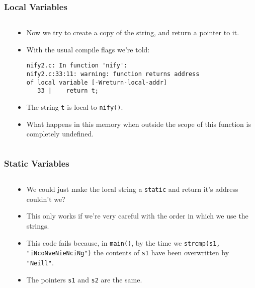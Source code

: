 \begin{frame}[fragile]
\frametitle{Local Variables}
\begin{columns}[T]

\begin{column}{0.35\textwidth}

\end{column}

\pause
\begin{column}{0.55\textwidth}
\begin{itemize}[<+->]
\item Now we try to create a copy of the string, and return a pointer to it.
\item With the usual compile flags we're told:
\begin{verbatim}
nify2.c: In function 'nify':
nify2.c:33:11: warning: function returns address
of local variable [-Wreturn-local-addr]
   33 |    return t;
\end{verbatim}
\item The string \verb^t^ is local to \verb^nify()^.
\item What happens in this memory when outside the scope of this function is completely undefined.
\end{itemize}
\end{column}

\end{columns}
\end{frame}


\begin{frame}[fragile]
\frametitle{Static Variables}
\begin{columns}[T]

\begin{column}{0.35\textwidth}

\end{column}

\pause
\begin{column}{0.55\textwidth}
\begin{itemize}[<+->]
\item We could just make the local string a \verb^static^ and return it's address couldn't we?
\item This only works if we're very careful with the order in which we use the strings.
\item This code fails because, in \verb^main()^, by the time we \verb^strcmp(s1, "iNcoNveNieNciNg")^ the contents of \verb^s1^ have been overwritten by \verb^"Neill"^. 
\item The pointers \verb^s1^ and \verb^s2^ are the same.
\end{itemize}
\end{column}

\end{columns}
\end{frame}

